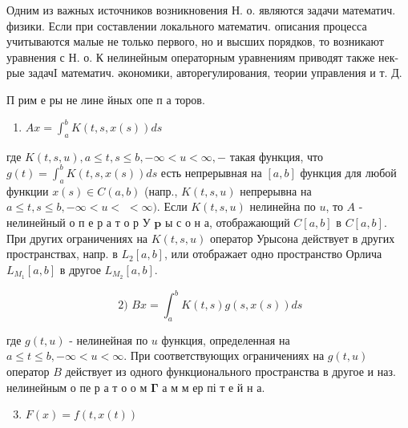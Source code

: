 \documentclass[10pt]{article}
\begin{document}
Одним из важных источников возникновения Н. о. являются задачи математич. физики. Если при составлении локального математич. описания процесса учитываются малые не только первого, но и высших порядков, то возникают уравнения с $Н$. о. К нелинейным операторным уравнениям приводят также нек-рые задачI математич. әкономики, авторегулирования, теории управления и т. Д.



П рим е ры не лине йных опе п а торов.



\begin{enumerate}

  \item $A x=\int_{a}^{b} K(t, s, x(s)) d s$

\end{enumerate}



где $K(t, s, u), a \leqslant t, s \leqslant b,-\infty<u<\infty,-$ такая функция, что $g(t)=\int_{a}^{b} K(t, s, x(s)) d s$ есть непрерывная на $[a, b]$ функция для любой функции $x(s) \in C(a, b)$ (напр., $K(t, s, u)$ непрерывна на $a \leqslant t, s \leqslant b,-\infty<u<$ $<\infty)$. Если $K(t, s, u)$ нелинейна по $u$, то $A$ - нелинейный о п е р а т о р У $\mathbf{p}$ ы с о н а, отображающий $C[a, b]$ в $C[a, b]$. При других ограничениях на $K(t, s, u)$ оператор Урысона действует в других пространствах, напр. в $L_{2}[a, b]$, или отображает одно пространство Орлича $L_{M_{1}}[a, b]$ в другое $L_{M_{2}}[a, b]$.



\[

\text { 2) } B x=\int_{a}^{b} K(t, s) g(s, x(s)) d s

\]



где $g(t, u)$ - нелинейная по $u$ функция, определенная на $a \leqslant t \leqslant b,-\infty<u<\infty$. При соответствующих ограничениях на $g(t, u)$ оператор $B$ действует из одного функционального пространства в другое и наз. нелинейным о пе р а т о о м $\boldsymbol{\Gamma}$ а м м ер пі т е й н а.



\begin{enumerate}

  \setcounter{enumi}{2}

  \item $F(x)=f(t, x(t))$

\end{enumerate}
\end{document}

